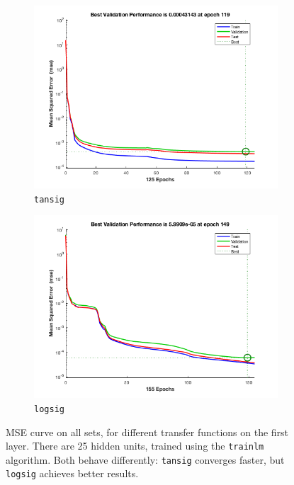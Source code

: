 \documentclass[a4paper, 10pt]{article}
\begin{document}
  \begin{figure}[ht]
    \centering
    \begin{subfigure}[t]{0.35\linewidth}
      \includegraphics[width=1\linewidth]{./project/tansig_MSE.png}
      \caption{\texttt{tansig}}
    \end{subfigure}
    \begin{subfigure}[t]{0.35\linewidth}
      \includegraphics[width=1\linewidth]{./project/logsig_MSE.png}
      \caption{\texttt{logsig}}
    \end{subfigure}
    \caption{MSE curve on all sets, for different transfer functions on the 
    first layer. There are 25 hidden units, trained using the \texttt{trainlm}
  algorithm. Both behave differently: \texttt{tansig} converges faster, but
    \texttt{logsig} achieves better results.}
    \label{fig:l5_mse_curves}
  \end{figure}
\end{document}
